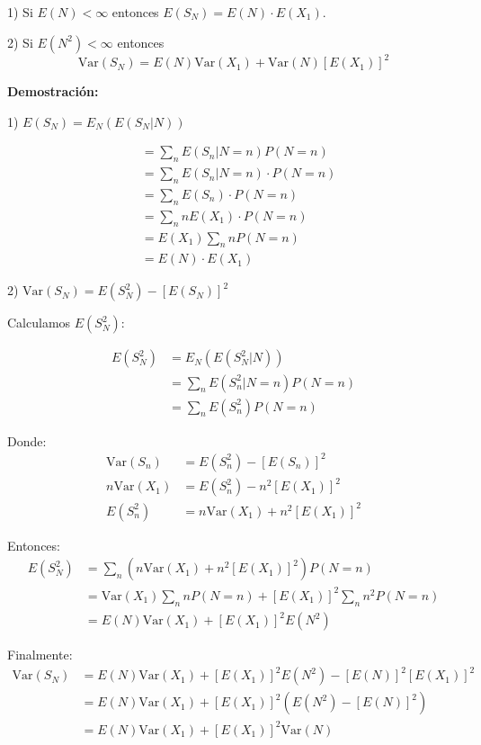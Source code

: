 \documentclass[12pt]{article}
\begin{document}
1) Si $E(N) < \infty$ entonces $E(S_N) = E(N) \cdot E(X_1)$.

2) Si $E(N^2) < \infty$ entonces 
\begin{equation*}
\text{Var}(S_N) = E(N) \text{Var}(X_1) + \text{Var}(N) [E(X_1)]^2
\end{equation*}

\textbf{Demostración:}

1) $E(S_N) = E_N(E(S_N|N))$

\begin{align*}
&= \sum_n E(S_n|N=n) P(N=n) \\
&= \sum_n E(S_n|N=n) \cdot P(N=n) \\
&= \sum_n E(S_n) \cdot P(N=n) \\
&= \sum_n n E(X_1) \cdot P(N=n) \\
&= E(X_1) \sum_n n P(N=n) \\
&= E(N) \cdot E(X_1)
\end{align*}

2) $\text{Var}(S_N) = E(S_N^2) - [E(S_N)]^2$

Calculamos $E(S_N^2)$:

\begin{align*}
E(S_N^2) &= E_N(E(S_N^2|N)) \\
&= \sum_n E(S_n^2|N=n) P(N=n) \\
&= \sum_n E(S_n^2) P(N=n)
\end{align*}

Donde:
\begin{align*}
\text{Var}(S_n) &= E(S_n^2) - [E(S_n)]^2 \\
n\text{Var}(X_1) &= E(S_n^2) - n^2[E(X_1)]^2 \\
E(S_n^2) &= n\text{Var}(X_1) + n^2[E(X_1)]^2
\end{align*}

Entonces:
\begin{align*}
E(S_N^2) &= \sum_n \left(n\text{Var}(X_1) + n^2[E(X_1)]^2\right) P(N=n) \\
&= \text{Var}(X_1) \sum_n n P(N=n) + [E(X_1)]^2 \sum_n n^2 P(N=n) \\
&= E(N)\text{Var}(X_1) + [E(X_1)]^2 E(N^2)
\end{align*}

Finalmente:
\begin{align*}
\text{Var}(S_N) &= E(N)\text{Var}(X_1) + [E(X_1)]^2 E(N^2) - [E(N)]^2[E(X_1)]^2 \\
&= E(N)\text{Var}(X_1) + [E(X_1)]^2\left(E(N^2) - [E(N)]^2\right) \\
&= E(N)\text{Var}(X_1) + [E(X_1)]^2\text{Var}(N)
\end{align*}
\end{document}
